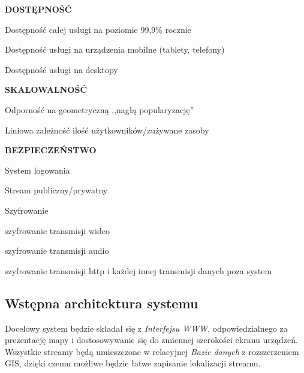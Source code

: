 \begin{packed_item}
{\begin{packed_item}
        \end{packed_item}
    }
    \item{
        \textbf{DOSTĘPNOŚĆ}
        \begin{packed_item}
            \item{Dostępność całej usługi na poziomie 99,9\% rocznie}
            \item{Dostępność usługi na urządzenia mobilne (tablety, telefony)}
            \item{Dostępność usługi na desktopy}
        \end{packed_item}
    }
    \item{
        \textbf{SKALOWALNOŚĆ}
        \begin{packed_item}
            \item{Odporność na geometryczną ,,nagłą popularyzację''}
            \item{Liniowa zależność ilość użytkowników/zużywane zasoby}
        \end{packed_item}
    }
    \item{
        \textbf{BEZPIECZEŃSTWO}
        \begin{packed_item}
            \item{
                System logowania
            }
            \item{
                Stream publiczny/prywatny
            }
            \item{
                Szyfrowanie
                \begin{packed_item}
                    \item{szyfrowanie transmisji wideo}
                    \item{szyfrowanie transmisji audio}
                    \item{szyfrowanie transmisji http i każdej innej transmisji danych poza system}
                \end{packed_item}
            }
        \end{packed_item}
    }
\end{packed_item}

\subsection{Wstępna architektura systemu}
\label{sec:EtapIwstepnaArchitekturaSystemu}

Docelowy system będzie składał się z \textit{Interfejsu WWW}, odpowiedzialnego za prezentację mapy i dostosowywanie się do zmiennej szerokości ekranu urządzeń. Wszystkie streamy będą umieszczone w relacyjnej \textit{Bazie danych} z rozszerzeniem GIS, dzięki czemu możliwe będzie łatwe zapisanie lokalizacji streamu.

